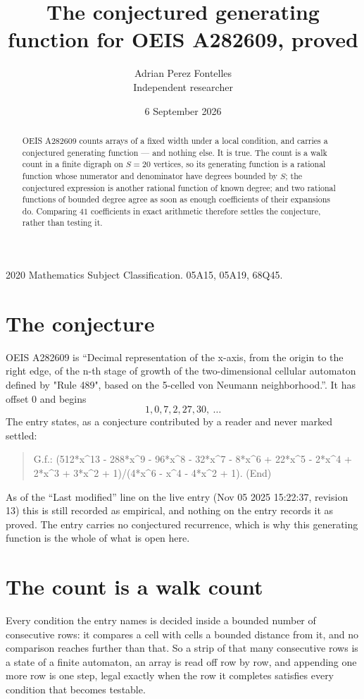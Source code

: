 \documentclass[11pt,a4paper]{article}
\title{The conjectured generating function for OEIS A282609, proved}
\author{Adrian Perez Fontelles\\ \small Independent researcher}
\date{6 September 2026}
\theoremstyle{plain}
\theoremstyle{definition}
\begin{document}
\maketitle

\begin{abstract}
OEIS A282609 counts arrays of a fixed width under a local condition, and carries a conjectured
generating function --- and nothing else. It is true. The count is a walk count in a finite
digraph on $S=20$ vertices, so its generating function is a rational function whose numerator
and denominator have degrees bounded by $S$; the conjectured expression is another rational
function of known degree; and two rational functions of bounded degree agree as soon as enough
coefficients of their expansions do. Comparing $41$ coefficients in exact arithmetic
therefore settles the conjecture, rather than testing it.
\end{abstract}

\noindent\small 2020 Mathematics Subject Classification. 05A15, 05A19, 68Q45.\normalsize

\section{The conjecture}

OEIS A282609 is ``Decimal representation of the x-axis, from the origin to the right edge, of the n-th stage of growth of the two-dimensional cellular automaton defined by "Rule 489", based on the 5-celled von Neumann neighborhood.''. It has offset $0$ and begins
\[
1, 0, 7, 2, 27, 30,\ \dots
\]
The entry states, as a conjecture contributed by a reader and never marked settled:
\begin{quote}
G.f.: (512*x\^{}13 - 288*x\^{}9 - 96*x\^{}8 - 32*x\^{}7 - 8*x\^{}6 + 22*x\^{}5 - 2*x\^{}4 + 2*x\^{}3 + 3*x\^{}2 + 1)/(4*x\^{}6 - x\^{}4 - 4*x\^{}2 + 1). (End)
\end{quote}
As of the ``Last modified'' line on the live entry (Nov 05 2025 15:22:37, revision 13) this is still
recorded as empirical, and nothing on the entry records it as proved. The entry carries no
conjectured recurrence, which is why this generating function is the whole of what is open
here.

\section{The count is a walk count}

Every condition the entry names is decided inside a bounded number of consecutive rows: it
compares a cell with cells a bounded distance from it, and no comparison reaches further than
that. So a strip of that many consecutive rows is a state of a finite automaton, an array is
read off row by row, and appending one more row is one step, legal exactly when the row it
completes satisfies every condition that becomes testable.
\end{document}
